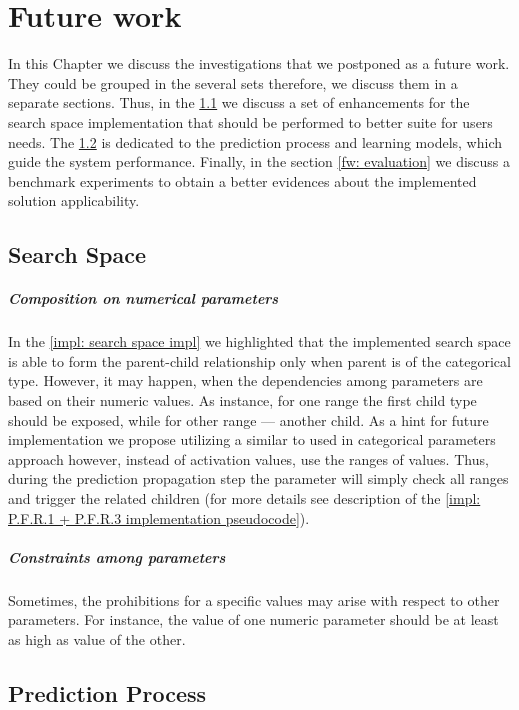 \chapter{Future work}
In this Chapter we discuss the investigations that we postponed as a future work. They could be grouped in the several sets therefore, we discuss them in a separate sections. Thus, in the \cref{fw: search space} we discuss a set of enhancements for the search space implementation that should be performed to better suite for users needs. The \cref{fw: prediction process} is dedicated to the prediction process and learning models, which guide the system performance. Finally, in the section \cref{fw: evaluation} we discuss a benchmark experiments to obtain a better evidences about the implemented solution applicability.

\section{Search Space}\label{fw: search space}
\paragraph{Composition on numerical parameters} In the \cref{impl: search space impl} we highlighted that the implemented search space is able to form the parent-child relationship only when parent is of the categorical type. However, it may happen, when the dependencies among parameters are based on their numeric values. As instance, for one range the first child type should be exposed, while for other range — another child. As a hint for future implementation we propose utilizing a similar to used in categorical parameters approach however, instead of activation values, use the ranges of values. Thus, during the prediction propagation step the parameter will simply check all ranges and trigger the related children (for more details see description of the \cref{impl: P.F.R.1 + P.F.R.3 implementation pseudocode}).

\paragraph{Constraints among parameters} Sometimes, the prohibitions for a specific values may arise with respect to other parameters. For instance, the value of one numeric parameter should be at least as high as value of the other. 


\section{Prediction Process}\label{fw: prediction process}
